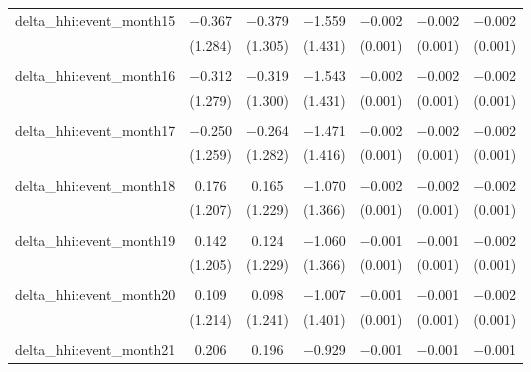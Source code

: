 \begin{table}[H]
{\begin{tabular}{@{\extracolsep{5pt}}lcccccc}
  delta\_hhi:event\_month15 & $-$0.367 & $-$0.379 & $-$1.559 & $-$0.002 & $-$0.002 & $-$0.002 \\  

   & (1.284) & (1.305) & (1.431) & (0.001) & (0.001) & (0.001) \\  

   & & & & & & \\  

  delta\_hhi:event\_month16 & $-$0.312 & $-$0.319 & $-$1.543 & $-$0.002 & $-$0.002 & $-$0.002 \\  

   & (1.279) & (1.300) & (1.431) & (0.001) & (0.001) & (0.001) \\  

   & & & & & & \\  

  delta\_hhi:event\_month17 & $-$0.250 & $-$0.264 & $-$1.471 & $-$0.002 & $-$0.002 & $-$0.002 \\  

   & (1.259) & (1.282) & (1.416) & (0.001) & (0.001) & (0.001) \\  

   & & & & & & \\  

  delta\_hhi:event\_month18 & 0.176 & 0.165 & $-$1.070 & $-$0.002 & $-$0.002 & $-$0.002 \\  

   & (1.207) & (1.229) & (1.366) & (0.001) & (0.001) & (0.001) \\  

   & & & & & & \\  

  delta\_hhi:event\_month19 & 0.142 & 0.124 & $-$1.060 & $-$0.001 & $-$0.001 & $-$0.002 \\  

   & (1.205) & (1.229) & (1.366) & (0.001) & (0.001) & (0.001) \\  

   & & & & & & \\  

  delta\_hhi:event\_month20 & 0.109 & 0.098 & $-$1.007 & $-$0.001 & $-$0.001 & $-$0.002 \\  

   & (1.214) & (1.241) & (1.401) & (0.001) & (0.001) & (0.001) \\  

   & & & & & & \\  

  delta\_hhi:event\_month21 & 0.206 & 0.196 & $-$0.929 & $-$0.001 & $-$0.001 & $-$0.001 \\  


\end{tabular}}
\end{table}
